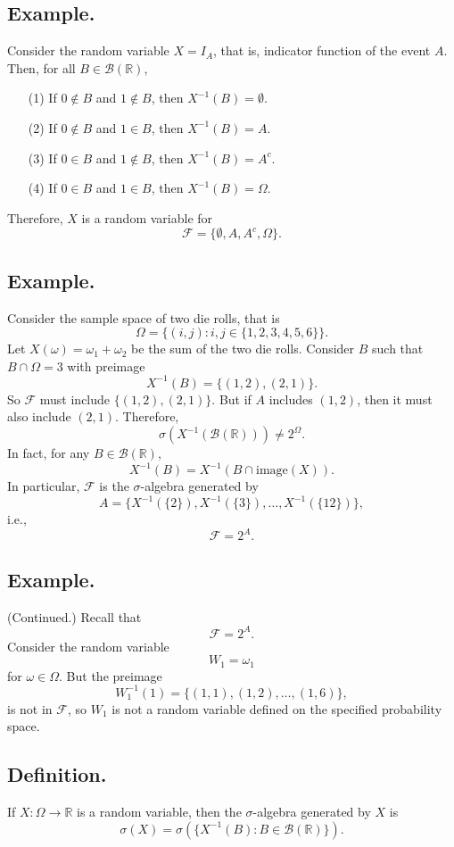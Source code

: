 \documentclass[titlepage]{article}
\begin{document}
\subsection{Example.} Consider the random variable $X = I_{A}$, that is, indicator function of the event $A$. Then, for all $B \in \mathcal{B}(\mathbb{R})$, 
\begin{enumerate}
\item[(1)] If $0 \not\in B$ and $1 \not\in B$, then $X^{-1}(B) = \emptyset$.
\item[(2)] If $0 \not\in B$ and $1 \in B$, then $X^{-1}(B) = A$.
\item[(3)] If $0 \in B$ and $1 \not\in B$, then $X^{-1}(B) = A^{c}$.
\item[(4)] If $0 \in B$ and $1 \in B$, then $X^{-1}(B) = \Omega$.
\end{enumerate}
Therefore, $X$ is a random variable for 
$$\mathcal{F} = \{\emptyset, A, A^{c}, \Omega\}.$$

\subsection{Example.} Consider the sample space of two die rolls, that is 
$$\Omega = \{(i, j): i, j \in \{1, 2, 3, 4, 5, 6\}\}.$$
Let $X(\omega) = \omega_{1} + \omega_{2}$ be the sum of the two die rolls. Consider $B$ such that $B \cap \Omega = 3$ with preimage 
$$X^{-1}(B) = \{(1, 2), (2, 1)\}.$$
So $\mathcal{F}$ must include $\{(1, 2), (2, 1)\}$. But if $A$ includes $(1, 2)$, then it must also include $(2, 1)$. Therefore, 
$$\sigma(X^{-1}(\mathcal{B}(\mathbb{R}))) \neq 2^{\Omega}.$$
In fact, for any $B \in \mathcal{B}(\mathbb{R})$,
$$X^{-1}(B) = X^{-1}(B \cap \text{image}(X)) .$$
In particular, $\mathcal{F}$ is the $\sigma$-algebra generated by 
$$A = \{X^{-1}(\{2\}), X^{-1}(\{3\}), \ldots, X^{-1}(\{12\})\},$$
i.e., 
$$\mathcal{F} = 2^{A}.$$

\subsection{Example.} (Continued.) Recall that 
$$\mathcal{F} = 2^{A}.$$
Consider the random variable $$W_{1} = \omega_{1}$$
for $\omega \in \Omega$. But the preimage 
$$W_{1}^{-1}(1) = \{(1, 1), (1, 2), \ldots, (1, 6)\},$$
is not in $\mathcal{F}$, so $W_{1}$ is not a random variable defined on the specified probability space.

\subsection{Definition.} If $X: \Omega \to \mathbb{R}$ is a random variable, then the $\sigma$-algebra generated by $X$ is 
$$\sigma(X) = \sigma\left(\{X^{-1}(B): B \in \mathcal{B}(\mathbb{R})\}\right).$$
\end{document}
